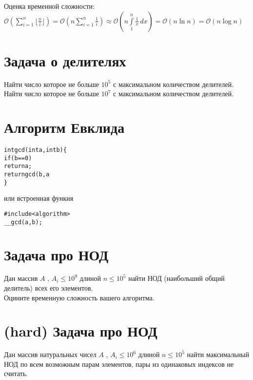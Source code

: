 \documentclass[10pt]{article}
\begin{document}
    Оценка временной сложности:
    \\
    $\mathcal{O}(\sum\limits_{i=1}^n\lfloor \frac{n}{i} \rfloor) = \mathcal{O}(n\sum\limits_{i=1}^n \frac{1}{i})  \approx  \mathcal{O}(n \int\limits_{1}^n \frac{1}{x}\,dx) = \mathcal{O}(n \ln n) = \mathcal{O}(n \log n)$
    \section{Задача о делителях}
    Найти число которое не больше $10^5$ с максимальном количеством делителей.
    \\
    Найти число которое не больше $10^7$ с максимальном количеством делителей.
    \section{Алгоритм Евклида}
        \begin{alltt}
int gcd(int a, int b) \{
    if (b == 0)
        return a;
    return gcd(b, a % b);
\}
    \end{alltt}
или встроенная функия
    \begin{alltt}
#include<algorithm>
__gcd(a , b);
    \end{alltt}
    \section{Задача про НОД} Дан массив $A$ , $A_i \leq 10^9$  длиной $n \leq 10^5$ найти НОД (наибольший общий делитель) всех его элементов.
    \\
    Оцините временную сложность вашего алгоритма.
    \\
    
    \section{(hard) Задача про НОД}
    Дан массив натуральных чисел $A$ , $A_i \leq 10^6$  длиной $n \leq 10^5$ найти максимальный НОД по всем возможным парам элементов, пары из одинаковых индексов не считать.
    \\
    \\
    
\end{document}
